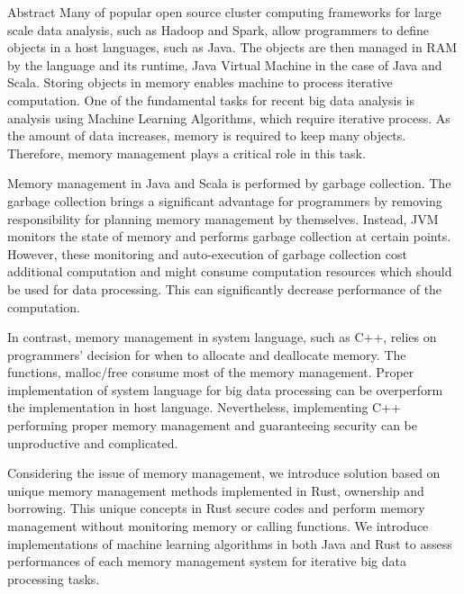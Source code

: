 
Abstract 
Many of popular open source cluster computing frameworks for large scale data analysis, such as Hadoop and Spark, 
allow programmers to define objects in a host languages, such as Java. The objects are then managed in RAM 
by the language and its runtime, Java Virtual Machine in the case of Java and Scala. Storing objects 
in memory enables machine to process iterative computation. One of the fundamental tasks for recent big data analysis 
is analysis using Machine Learning Algorithms, which require iterative process. As the amount of data increases, memory is required to keep many objects. 
Therefore, memory management plays a critical role in this task. 

Memory management in Java and Scala is performed by garbage collection. The garbage collection brings a significant advantage 
for programmers by removing responsibility for planning memory management by themselves. Instead, JVM monitors the state of memory 
and performs garbage collection at certain points. However, these monitoring and auto-execution of garbage collection cost additional computation 
and might consume computation resources which should be used for data processing. This can significantly decrease performance of the computation. 

In contrast, memory management in system language, such as C++, relies on programmers’ decision for when to allocate and deallocate memory. 
The functions, malloc/free consume most of the memory management. Proper implementation of system language for big data processing can be overperform the implementation in host language. 
Nevertheless, implementing C++ performing proper memory management and guaranteeing security can be unproductive and complicated. 

Considering the issue of memory management, we introduce solution based on unique memory management methods implemented in Rust, ownership and borrowing. 
This unique concepts in Rust secure codes and perform memory management without monitoring memory or calling functions. 
We introduce implementations of machine learning algorithms in both Java and Rust to assess performances of each memory management system for iterative big data processing tasks.

